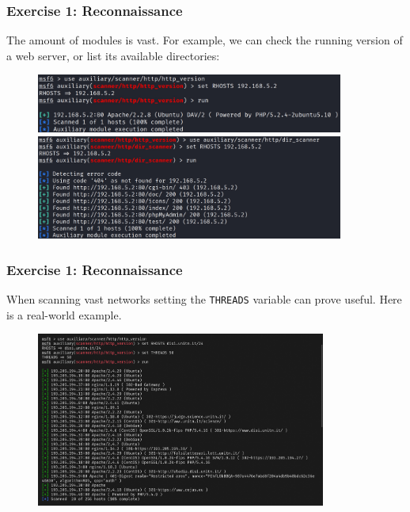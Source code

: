 \documentclass[handout]{beamer}
\begin{document}
\begin{frame}
    \frametitle{Exercise 1: Reconnaissance}
    The amount of modules is vast. For example, we can check the running version of a web server, or list its available directories:
    
	\begin{figure}
    	\centering
    	\includegraphics[width=0.9\textwidth]{../drawable/exercise_1_screenshots/es1-http.jpg}
    	\includegraphics[width=0.9\textwidth]{../drawable/exercise_1_screenshots/es1-httpdir.jpg}
	\end{figure}
\end{frame}

\begin{frame}
    \frametitle{Exercise 1: Reconnaissance}
    When scanning vast networks setting the \texttt{THREADS} variable can prove useful. Here is a real-world example.
    
	\begin{figure}
		\centering
		\includegraphics[width=0.85\textwidth]{../drawable/exercise_1_screenshots/es1-http-disi.png}
	\end{figure}
\end{frame}
\end{document}
